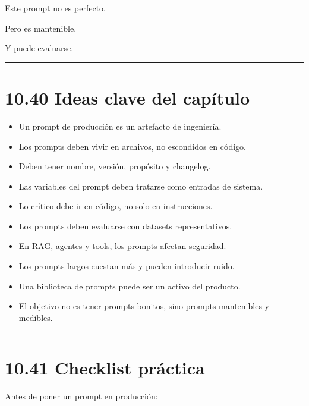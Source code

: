 Este prompt no es perfecto.

Pero es mantenible.

Y puede evaluarse.

\begin{center}\rule{0.5\linewidth}{0.5pt}\end{center}

\section{10.40 Ideas clave del
capítulo}\label{ideas-clave-del-capuxedtulo-9}

\begin{itemize}
\tightlist
\item
  Un prompt de producción es un artefacto de ingeniería.
\item
  Los prompts deben vivir en archivos, no escondidos en código.
\item
  Deben tener nombre, versión, propósito y changelog.
\item
  Las variables del prompt deben tratarse como entradas de sistema.
\item
  Lo crítico debe ir en código, no solo en instrucciones.
\item
  Los prompts deben evaluarse con datasets representativos.
\item
  En RAG, agentes y tools, los prompts afectan seguridad.
\item
  Los prompts largos cuestan más y pueden introducir ruido.
\item
  Una biblioteca de prompts puede ser un activo del producto.
\item
  El objetivo no es tener prompts bonitos, sino prompts mantenibles y
  medibles.
\end{itemize}

\begin{center}\rule{0.5\linewidth}{0.5pt}\end{center}

\section{10.41 Checklist práctica}\label{checklist-pruxe1ctica-9}

Antes de poner un prompt en producción:


